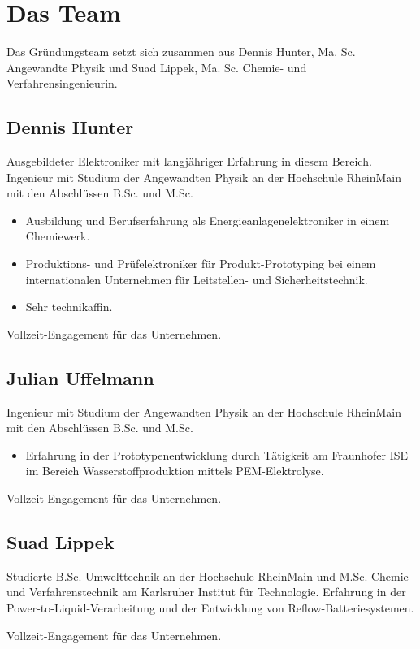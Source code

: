 \chapter{Das Team}

Das Gründungsteam setzt sich zusammen aus Dennis Hunter, Ma. Sc. Angewandte Physik und Suad Lippek, Ma. Sc. Chemie- und Verfahrensingenieurin.

\section{Dennis Hunter}

    Ausgebildeter Elektroniker mit langjähriger Erfahrung in diesem Bereich.
    Ingenieur mit Studium der Angewandten Physik an der Hochschule RheinMain mit den Abschlüssen B.Sc. und M.Sc.
    \begin{itemize}
        \item Ausbildung und Berufserfahrung als Energieanlagenelektroniker in einem Chemiewerk.
        \item Produktions- und Prüfelektroniker für Produkt-Prototyping bei einem internationalen Unternehmen für Leitstellen- und Sicherheitstechnik.
        \item Sehr technikaffin.
    \end{itemize}
    Vollzeit-Engagement für das Unternehmen.

\section{Julian Uffelmann}

    Ingenieur mit Studium der Angewandten Physik an der Hochschule RheinMain mit den Abschlüssen B.Sc. und M.Sc.
    \begin{itemize}
        \item Erfahrung in der Prototypenentwicklung durch Tätigkeit am Fraunhofer ISE im Bereich Wasserstoffproduktion mittels PEM-Elektrolyse.
    \end{itemize}
    Vollzeit-Engagement für das Unternehmen.

\section{Suad Lippek}

    Studierte B.Sc. Umwelttechnik an der Hochschule RheinMain und M.Sc. Chemie- und Verfahrenstechnik am Karlsruher Institut für Technologie.
    Erfahrung in der Power-to-Liquid-Verarbeitung und der Entwicklung von Reflow-Batteriesystemen.

    Vollzeit-Engagement für das Unternehmen.